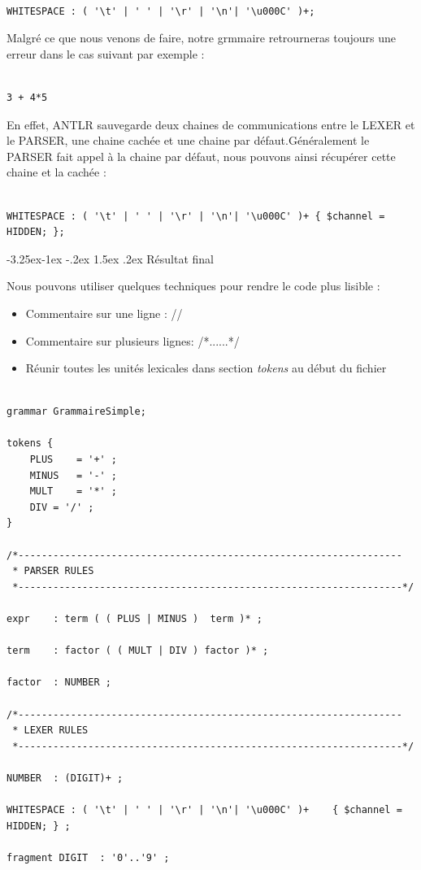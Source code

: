 \documentclass{article}
\makeatletter
\newcounter {subsubsubsection}[subsubsection]
\newcommand\subsubsubsection{\@startsection{subsubsubsection}{4}{\z@}%
                                     {-3.25ex\@plus -1ex \@minus -.2ex}%
                                     {1.5ex \@plus .2ex}%
                                     {\normalfont\normalsize\bfseries}}
\makeatother
\begin{document}
\begin{verbatim}

WHITESPACE : ( '\t' | ' ' | '\r' | '\n'| '\u000C' )+;

\end{verbatim}

Malgré ce que nous venons de faire, notre grmmaire retrourneras toujours une erreur dans le cas suivant par exemple :
\begin{verbatim}

3 + 4*5

\end{verbatim}
En effet, ANTLR sauvegarde deux chaines de communications entre le LEXER et le PARSER, une chaine cachée et une chaine par défaut.Généralement le PARSER fait appel à la chaine par défaut, nous pouvons ainsi récupérer cette chaine et la cachée :

\begin{verbatim}

WHITESPACE : ( '\t' | ' ' | '\r' | '\n'| '\u000C' )+ { $channel = HIDDEN; };

\end{verbatim}

\subsubsubsection{Résultat final}

Nous pouvons utiliser quelques techniques pour rendre le code plus lisible :

\begin{itemize}

\item Commentaire sur une ligne : //
\item Commentaire sur plusieurs lignes: /*......*/
\item Réunir toutes les unités lexicales dans section \textsl{tokens} au début du fichier
\end{itemize}

\begin{verbatim}

grammar GrammaireSimple;
 
tokens {
    PLUS    = '+' ;
    MINUS   = '-' ;
    MULT    = '*' ;
    DIV = '/' ;
}
 
/*------------------------------------------------------------------
 * PARSER RULES
 *------------------------------------------------------------------*/
 
expr    : term ( ( PLUS | MINUS )  term )* ;
 
term    : factor ( ( MULT | DIV ) factor )* ;
 
factor  : NUMBER ;
 
/*------------------------------------------------------------------
 * LEXER RULES
 *------------------------------------------------------------------*/
 
NUMBER  : (DIGIT)+ ;
 
WHITESPACE : ( '\t' | ' ' | '\r' | '\n'| '\u000C' )+    { $channel = HIDDEN; } ;
 
fragment DIGIT  : '0'..'9' ;

\end{verbatim}
\end{document}
